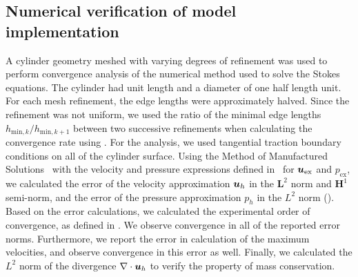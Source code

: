 \documentclass{WileyMSP-template}
\providecommand{\DIFadd}[1]{{\protect\color{blue}\uwave{#1}}} %
\providecommand{\DIFaddbegin}{} %
\providecommand{\DIFaddend}{} %
\begin{document}
\subsection{Numerical verification of \DIFaddbegin \DIFadd{CSF flow }\DIFaddend model implementation}\label{subsec:numerical_verification}
A cylinder geometry meshed with varying degrees of refinement was used to
perform convergence analysis of the numerical method used to solve the Stokes equations.
The cylinder had unit length and a diameter of one half length unit.
For each mesh refinement, the edge lengths were approximately halved.
Since the refinement was not uniform, we used the ratio of the minimal
edge lengths $h_{\mathrm{min}, k}/h_{\mathrm{min}, k+1}$ between two 
successive refinements when calculating the convergence rate using
.
For the analysis, we used tangential traction boundary conditions on all
of the cylinder surface. Using the Method of Manufactured Solutions~\cite{Roache2001CodeSolutions}
with the velocity and pressure expressions defined in~
for $\bm{u}_{\mathrm{ex}}$ and $p_{\mathrm{ex}}$, we calculated the error of 
the velocity approximation $\bm{u}_h$
in the $\mathbf{L}^2$ norm and $\mathbf{H}^1$ semi-norm,
and the error of the pressure approximation $p_h$ in the $L^2$ norm ().
Based on the error calculations,
we calculated the experimental order of convergence,
as defined in .
We observe convergence in all of the reported error norms. Furthermore,
we report the error in calculation of the maximum velocities, and observe
convergence in this error as well. Finally, we calculated the $L^2$ norm of
the divergence $\nabla\cdot\bm{u}_h$ to verify the property of mass conservation.
\end{document}
